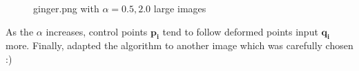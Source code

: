 \documentclass[paper=a4, fontsize=11pt]{scrartcl} %
\numberwithin{equation}{section} %
\numberwithin{figure}{section} %
\numberwithin{table}{section} %
\renewcommand{\vec}[1]{\mathbf{#1}}
\begin{document}
\begin{figure}[H]
\caption{ginger.png with $\alpha = 0.5, 2.0$ large images\label{fig:simple}}
\centering
{}
\end{figure}

As the $\alpha$ increases, control points $\vec{p_i}$ tend to follow deformed points input $\vec{q_i}$ more. Finally, adapted the algorithm to another image which was carefully chosen :)
\end{document}
